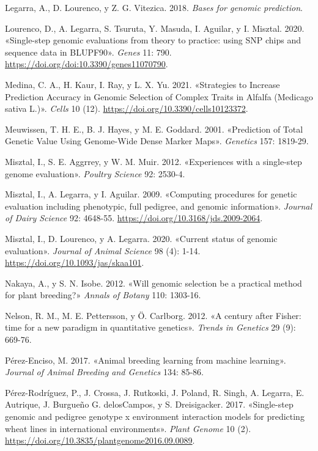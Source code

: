 \documentclass[11pt,spanish,a4paper,oneside,]{book} %
\begin{document}
\leavevmode\hypertarget{ref-cite:30}{}%
Legarra, A., D. Lourenco, y Z. G. Vitezica. 2018. \emph{Bases for genomic prediction}.

\leavevmode\hypertarget{ref-cite:22}{}%
Lourenco, D., A. Legarra, S. Tsuruta, Y. Masuda, I. Aguilar, y I. Misztal. 2020. «Single-step genomic evaluations from theory to practice: using SNP chips and sequence data in BLUPF90». \emph{Genes} 11: 790. \url{https://doi.org/doi:10.3390/genes11070790}.

\leavevmode\hypertarget{ref-cite:38}{}%
Medina, C. A., H. Kaur, I. Ray, y L. X. Yu. 2021. «Strategies to Increase Prediction Accuracy in Genomic Selection of Complex Traits in Alfalfa (Medicago sativa L.)». \emph{Cells} 10 (12). \url{https://doi.org/10.3390/cells10123372}.

\leavevmode\hypertarget{ref-cite:8}{}%
Meuwissen, T. H. E., B. J. Hayes, y M. E. Goddard. 2001. «Prediction of Total Genetic Value Using Genome-Wide Dense Marker Maps». \emph{Genetics} 157: 1819-29.

\leavevmode\hypertarget{ref-cite:14}{}%
Misztal, I., S. E. Aggrrey, y W. M. Muir. 2012. «Experiences with a single-step genome evaluation». \emph{Poultry Science} 92: 2530-4.

\leavevmode\hypertarget{ref-cite:16}{}%
Misztal, I., A. Legarra, y I. Aguilar. 2009. «Computing procedures for genetic evaluation including phenotypic, full pedigree, and genomic information». \emph{Journal of Dairy Science} 92: 4648-55. \url{https://doi.org/10.3168/jds.2009-2064}.

\leavevmode\hypertarget{ref-cite:18}{}%
Misztal, I., D. Lourenco, y A. Legarra. 2020. «Current status of genomic evaluation». \emph{Journal of Animal Science} 98 (4): 1-14. \url{https://doi.org/10.1093/jas/skaa101}.

\leavevmode\hypertarget{ref-cite:6}{}%
Nakaya, A., y S. N. Isobe. 2012. «Will genomic selection be a practical method for plant breeding?» \emph{Annals of Botany} 110: 1303-16.

\leavevmode\hypertarget{ref-cite:2}{}%
Nelson, R. M., M. E. Pettersson, y Ö. Carlborg. 2012. «A century after Fisher: time for a new paradigm in quantitative genetics». \emph{Trends in Genetics} 29 (9): 669-76.

\leavevmode\hypertarget{ref-cite:5}{}%
Pérez-Enciso, M. 2017. «Animal breeding learning from machine learning». \emph{Journal of Animal Breeding and Genetics} 134: 85-86.

\leavevmode\hypertarget{ref-cite:19}{}%
Pérez-Rodríguez, P., J. Crossa, J. Rutkoski, J. Poland, R. Singh, A. Legarra, E. Autrique, J. Burgueño G. delosCampos, y S. Dreisigacker. 2017. «Single-step genomic and pedigree genotype x environment interaction models for predicting wheat lines in international environments». \emph{Plant Genome} 10 (2). \url{https://doi.org/10.3835/plantgenome2016.09.0089}.
\end{document}
